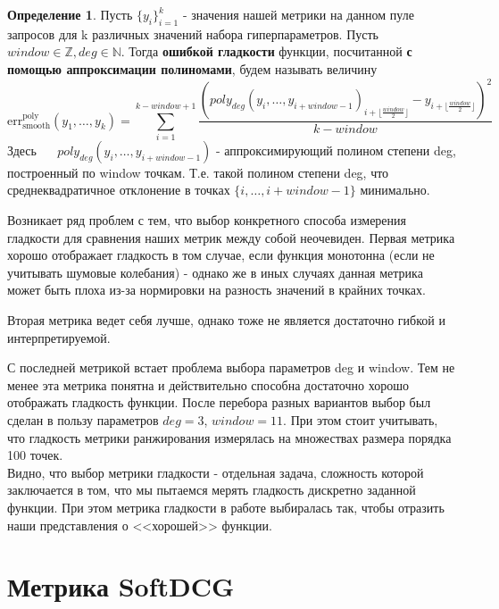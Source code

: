 \documentclass[14pt,a4paper]{amsart}
\theoremstyle{definition}
\newtheorem{definition}{Определение}[section]
\theoremstyle{definition}
\newcommand{\Sum}{\sum\limits}
\renewcommand\t{\text}
\renewcommand\b{\textbf}
\begin{document}
\begin{definition}
Пусть $\{y_i\}_{i=1}^k$ - значения нашей метрики на данном пуле запросов для k различных значений набора гиперпараметров. Пусть $window \in \mathbb{Z}, deg \in \mathbb{N}$. Тогда \b{ошибкой гладкости} функции, посчитанной \b{с помощью аппроксимации полиномами}, будем называть величину
\begin{equation}
\t{err}_\t{smooth}^\t{poly}(y_1,\dots,y_k) = \Sum_{i=1}^{k - window + 1} \frac{\left(poly_{deg}(y_i,\dots,y_{i + window - 1})_{i + \lfloor{\frac{window}{2}}\rfloor} - y_{i + \lfloor{\frac{window}{2}}\rfloor}\right)^2}{k - window} \nonumber
\end{equation}
Здесь ~~ $poly_{deg}(y_i,\dots,y_{i + window - 1})$ - аппроксимирующий полином степени deg, построенный по window точкам. Т.е. такой полином степени deg, что среднеквадратичное отклонение в точках $\{i,\dots,i + window - 1\}$ минимально.
\end{definition}

Возникает ряд проблем с тем, что выбор конкретного способа измерения гладкости для сравнения наших метрик между собой неочевиден. Первая метрика хорошо отображает гладкость в том случае, если функция монотонна (если не учитывать шумовые колебания) - однако же в иных случаях данная метрика может быть плоха из-за нормировки на разность значений в крайних точках. 

Вторая метрика ведет себя лучше, однако тоже не является достаточно гибкой и интерпретируемой.

С последней метрикой встает проблема выбора параметров deg и window. Тем не менее эта метрика понятна и действительно способна достаточно хорошо отображать гладкость функции. После перебора разных вариантов выбор был сделан в пользу параметров ${deg = 3}$, ${window = 11}$. При этом стоит учитывать, что гладкость метрики ранжирования измерялась на множествах размера порядка 100 точек.\\

Видно, что выбор метрики гладкости - отдельная задача, сложность которой заключается в том, что мы пытаемся мерять гладкость дискретно заданной функции. При этом метрика гладкости в работе выбиралась так, чтобы отразить наши представления о <<хорошей>> функции.


\newpage
\section{Метрика SoftDCG}
\end{document}

